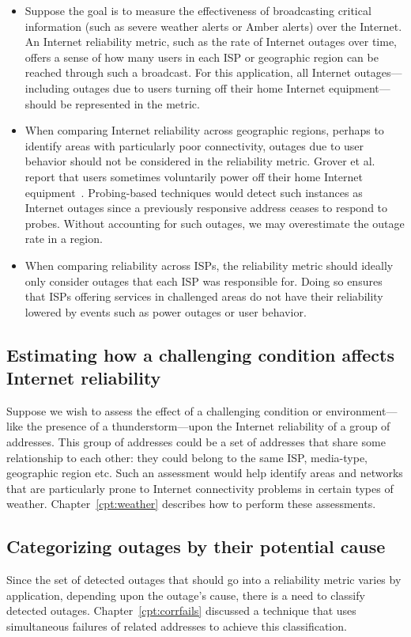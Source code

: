 \begin{itemize}

\item{Suppose the goal is to measure the effectiveness of broadcasting
    critical information (such as severe weather alerts or Amber
    alerts) over the Internet. An Internet reliability metric, such as
    the rate of Internet outages over time, offers a sense of how many
    users in each ISP or geographic region can be reached through such
    a broadcast. For this application, all Internet
    outages---including outages due to users turning off their home
    Internet equipment---should be represented in the metric. }

\item {When comparing Internet reliability across geographic regions,
    perhaps to identify areas with particularly poor connectivity, outages due to
    user behavior should not be considered in the reliability
    metric. Grover et al. report that users sometimes voluntarily
    power off their home Internet
    equipment~\cite{grover2013peeking}. Probing-based techniques would
  detect such instances as Internet outages since a previously
  responsive address ceases to respond to probes. Without accounting
  for such outages, we may overestimate the outage rate in a region.}
 
\item {When comparing reliability across ISPs, the reliability metric
should ideally only consider outages that each ISP was responsible
for. Doing so ensures that ISPs offering services in challenged areas
do not have their reliability lowered by events such as power outages
or user behavior.}

\end{itemize}

\subsection{Estimating how a challenging condition affects Internet
  reliability}

Suppose we wish to assess the effect of a challenging condition or environment---like
the presence of a thunderstorm---upon the Internet reliability of a
group of addresses. This group of addresses could be a set of
addresses that share some relationship to each other: they could
belong to the same ISP, media-type, geographic region etc. Such an
assessment would help identify areas and networks that are
particularly prone to Internet connectivity problems in certain types
of weather. Chapter~\ref{cpt:weather} describes how to perform these assessments.

\subsection{Categorizing outages by their potential cause}

Since the set of detected outages that should go into a reliability
metric varies by application, depending upon the outage's cause, there
is a need to classify detected outages. Chapter~\ref{cpt:corrfails}
discussed a technique that uses simultaneous failures of related addresses to achieve this classification.